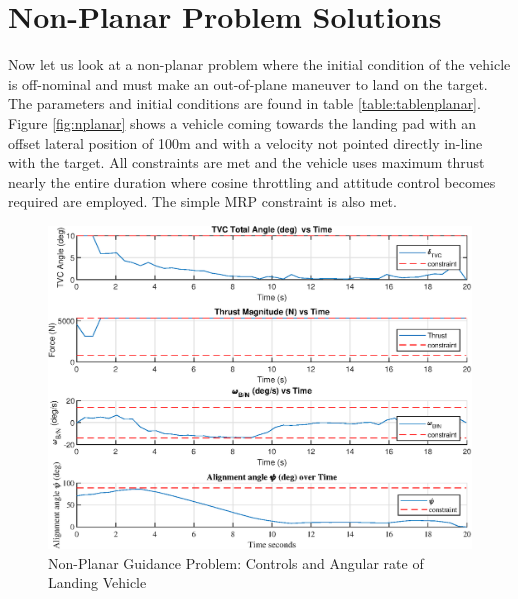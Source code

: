 \section{Non-Planar Problem Solutions}
Now let us look at a non-planar problem where the initial condition of the vehicle is off-nominal and must make an out-of-plane maneuver to land on the target. The parameters and initial conditions are found in table \ref{table:tablenplanar}. Figure \ref{fig:nplanar} shows a vehicle coming towards the landing pad with an offset lateral position of 100m and with a velocity not pointed directly in-line with the target. All constraints are met and the vehicle uses maximum thrust nearly the entire duration where cosine throttling and attitude control becomes required are employed. The simple MRP constraint is also met.

\begin{figure}[!htbp] 
  \centering
  \includegraphics[width=\textwidth]{figs/nonplanar_controls.eps}
  \caption{Non-Planar Guidance Problem: Controls and Angular rate of Landing Vehicle}
  \label{fig:nplanarcontrols}
 \end{figure}

